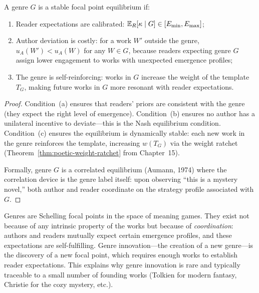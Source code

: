 \begin{theorem}
\label{thm:genre-stability}
A genre $G$ is a stable focal point equilibrium if:
\begin{enumerate}[label=(\alph*)]
  \item Reader expectations are calibrated: $\mathbb{E}_R[\kappa
    \mid G] \in [E_{\min}, E_{\max}]$;
  \item Author deviation is costly: for a work $W'$ outside the
    genre, $u_A(W') < u_A(W)$ for any $W \in G$, because readers
    expecting genre $G$ assign lower engagement to works with
    unexpected emergence profiles;
  \item The genre is self-reinforcing: works in $G$ increase
    the weight of the template $T_G$, making future works in $G$
    more resonant with reader expectations.
\end{enumerate}
\end{theorem}

\begin{proof}
Condition~(a) ensures that readers' priors are consistent with
the genre (they expect the right level of emergence).  Condition~(b)
ensures no author has a unilateral incentive to deviate---this is
the Nash equilibrium condition.  Condition~(c) ensures the
equilibrium is dynamically stable: each new work in the genre
reinforces the template, increasing $w(T_G)$ via the weight
ratchet (Theorem~\ref{thm:poetic-weight-ratchet} from Chapter~15).

Formally, genre $G$ is a correlated equilibrium (Aumann, 1974)
where the correlation device is the genre label itself: upon
observing ``this is a mystery novel,'' both author and reader
coordinate on the strategy profile associated with $G$.
\end{proof}

\begin{interpretation}
Genres are Schelling focal points in the space of meaning games.
They exist not because of any intrinsic property of the works
but because of \emph{coordination}: authors and readers mutually
expect certain emergence profiles, and these expectations are
self-fulfilling.  Genre innovation---the creation of a new
genre---is the discovery of a new focal point, which requires
enough works to establish reader expectations.  This explains
why genre innovation is rare and typically traceable to a small
number of founding works (Tolkien for modern fantasy, Christie
for the cozy mystery, etc.).
\end{interpretation}

